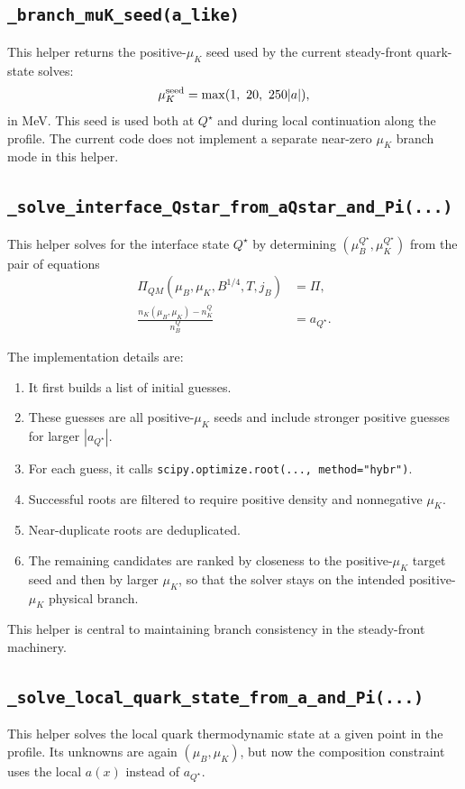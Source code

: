 \documentclass[11pt]{article}
\begin{document}
\subsection{\texttt{\_branch\_muK\_seed(a\_like)}}
This helper returns the positive-$\mu_K$ seed used by the current steady-front
quark-state solves:
\begin{equation}
\mu_K^{\rm seed} = \max(1,\ 20,\ 250 |a|),
\end{equation}
in MeV. This seed is used both at $Q^\star$ and during local continuation
along the profile. The current code does not implement a separate near-zero
$\mu_K$ branch mode in this helper.

\subsection{\texttt{\_solve\_interface\_Qstar\_from\_aQstar\_and\_Pi(...)}} 
This helper solves for the interface state $Q^\star$ by determining
$(\mu_B^{Q^\star}, \mu_K^{Q^\star})$ from the pair of equations
\begin{align}
\Pi_{QM}(\mu_B, \mu_K, B^{1/4}, T, j_B) &= \Pi, \\
\frac{n_K(\mu_B,\mu_K) - n_K^Q}{n_B^Q} &= a_{Q^\star}.
\end{align}

The implementation details are:
\begin{enumerate}[leftmargin=1.5em]
\item It first builds a list of initial guesses.
\item These guesses are all positive-$\mu_K$ seeds and include stronger
      positive guesses for larger $|a_{Q^\star}|$.
\item For each guess, it calls \texttt{scipy.optimize.root(..., method="hybr")}.
\item Successful roots are filtered to require positive density and
nonnegative $\mu_K$.
\item Near-duplicate roots are deduplicated.
\item The remaining candidates are ranked by closeness to the positive-$\mu_K$
      target seed and then by larger $\mu_K$, so that the solver stays on the
      intended positive-$\mu_K$ physical branch.
\end{enumerate}

This helper is central to maintaining branch consistency in the steady-front
machinery.

\subsection{\texttt{\_solve\_local\_quark\_state\_from\_a\_and\_Pi(...)}} 
This helper solves the local quark thermodynamic state at a given point in the
profile. Its unknowns are again $(\mu_B, \mu_K)$, but now the composition
constraint uses the local $a(x)$ instead of $a_{Q^\star}$.
\end{document}
